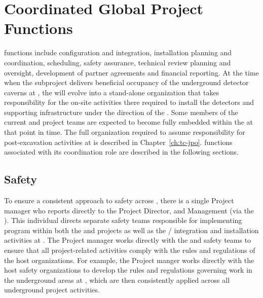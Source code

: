\section{Coordinated Global Project Functions}
\label{sec:global_project}

 functions include  configuration and integration,
installation planning and coordination, scheduling, safety assurance,
technical review planning and oversight, development of partner
agreements and financial reporting.  At the time when the 
 subproject delivers beneficial occupancy of
the underground detector caverns at , the  will evolve into a
stand-alone organization that takes responsibility for the on-site
activities %
there required to install the detectors and supporting
infrastructure under the direction of the .
Some members of the current  and  project teams are
expected to become fully embedded within the  at that point in
time.  The full  organization required to assume responsibility for
post-excavation activities at  is described in Chapter~\ref{ch:tc-jpo}.
 functions associated with its  coordination role
are described in the following sections.

\subsection{Safety}
\label{sec:dune_safety}

To ensure a consistent approach to safety across ,
there is a single Project  manager who reports directly to
the  Project Director,  and 
Management (via the  ).  This individual
directs separate safety teams responsible for implementing   program within both the  and
 projects as well as the /
integration and installation activities at .  The Project
 manager works directly with the  and  safety
teams to ensure that all project-related activities comply with the
rules and regulations of the host organizations.  For example, the
Project  manger works directly with the host safety
organizations to develop the rules and regulations governing work in
the underground areas at , which are then consistently applied
across all underground project activities.

